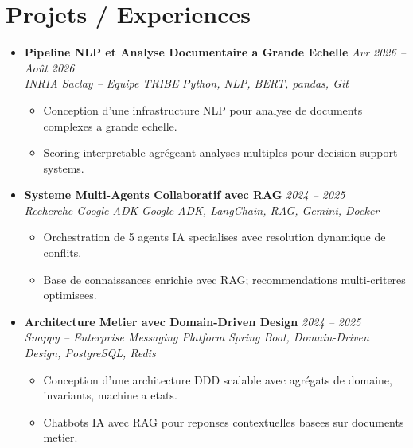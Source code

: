 \documentclass[a4paper,11pt]{article}
\begin{document}
\section{Projets / Experiences}
\begin{itemize}[leftmargin=*, label={-}]

\item \textbf{Pipeline NLP et Analyse Documentaire a Grande Echelle} \hfill \textit{Avr 2026 -- Ao\^ut 2026} \\
\textit{INRIA Saclay -- Equipe TRIBE} \hfill \textit{Python, NLP, BERT, pandas, Git}
\vspace{-2pt}
    \begin{itemize}[leftmargin=0.4cm, nosep, label=\tiny$\bullet$]
        \item \small{Conception d'une infrastructure NLP pour analyse de documents complexes a grande echelle.}
        \item \small{Scoring interpretable agr\'egeant analyses multiples pour decision support systems.}
    \end{itemize}
\vspace{3pt}

\item \textbf{Systeme Multi-Agents Collaboratif avec RAG} \hfill \textit{2024 -- 2025} \\
\textit{Recherche Google ADK} \hfill \textit{Google ADK, LangChain, RAG, Gemini, Docker}
\vspace{-2pt}
    \begin{itemize}[leftmargin=0.4cm, nosep, label=\tiny$\bullet$]
        \item \small{Orchestration de 5 agents IA specialises avec resolution dynamique de conflits.}
        \item \small{Base de connaissances enrichie avec RAG; recommendations multi-criteres optimisees.}
    \end{itemize}
\vspace{3pt}

\item \textbf{Architecture Metier avec Domain-Driven Design} \hfill \textit{2024 -- 2025} \\
\textit{Snappy -- Enterprise Messaging Platform} \hfill \textit{Spring Boot, Domain-Driven Design, PostgreSQL, Redis}
\vspace{-2pt}
    \begin{itemize}[leftmargin=0.4cm, nosep, label=\tiny$\bullet$]
        \item \small{Conception d'une architecture DDD scalable avec agrégats de domaine, invariants, machine a etats.}
        \item \small{Chatbots IA avec RAG pour reponses contextuelles basees sur documents metier.}
    \end{itemize}
\vspace{3pt}


\end{itemize}
\end{document}
